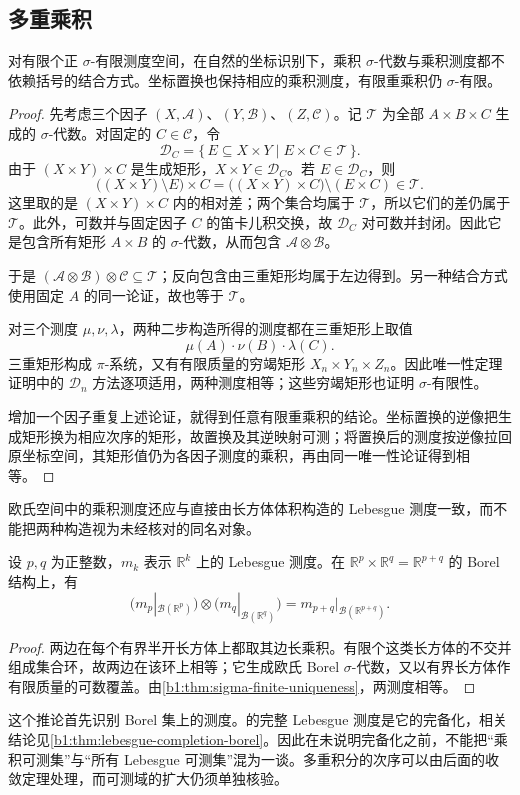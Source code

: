 \subsection{多重乘积}
\label{b1:subsec:070204}

\begin{proposition}\label{b1:prop:finite-product-associativity}
对有限个正 \(\sigma\)-有限测度空间，在自然的坐标识别下，乘积 \(\sigma\)-代数与乘积测度都不依赖括号的结合方式。坐标置换也保持相应的乘积测度，有限重乘积仍 \(\sigma\)-有限。
\end{proposition}
\begin{proof}
先考虑三个因子 \((X,\mathcal A)\)、\((Y,\mathcal B)\)、\((Z,\mathcal C)\)。记 \(\mathcal T\) 为全部 \(A\times B\times C\) 生成的 \(\sigma\)-代数。对固定的 \(C\in\mathcal C\)，令
\[
\mathcal D_C=\{\,E\subseteq X\times Y\mid E\times C\in\mathcal T\,\}.
\]
由于 \((X\times Y)\times C\) 是生成矩形，\(X\times Y\in\mathcal D_C\)。若 \(E\in\mathcal D_C\)，则
\[
\bigl((X\times Y)\setminus E\bigr)\times C
=\bigl((X\times Y)\times C\bigr)\setminus(E\times C)\in\mathcal T.
\]
这里取的是 \((X\times Y)\times C\) 内的相对差；两个集合均属于 \(\mathcal T\)，所以它们的差仍属于 \(\mathcal T\)。此外，可数并与固定因子 \(C\) 的笛卡儿积交换，故 \(\mathcal D_C\) 对可数并封闭。因此它是包含所有矩形 \(A\times B\) 的 \(\sigma\)-代数，从而包含 \(\mathcal A\otimes\mathcal B\)。

于是 \((\mathcal A\otimes\mathcal B)\otimes\mathcal C\subseteq\mathcal T\)；反向包含由三重矩形均属于左边得到。另一种结合方式使用固定 \(A\) 的同一论证，故也等于 \(\mathcal T\)。

对三个测度 \(\mu,\nu,\lambda\)，两种二步构造所得的测度都在三重矩形上取值
\[
\mu(A)\cdot\nu(B)\cdot\lambda(C).
\]
三重矩形构成 \(\pi\)-系统，又有有限质量的穷竭矩形 \(X_n\times Y_n\times Z_n\)。因此唯一性定理证明中的 \(\mathcal D_n\) 方法逐项适用，两种测度相等；这些穷竭矩形也证明 \(\sigma\)-有限性。

增加一个因子重复上述论证，就得到任意有限重乘积的结论。坐标置换的逆像把生成矩形换为相应次序的矩形，故置换及其逆映射可测；将置换后的测度按逆像拉回原坐标空间，其矩形值仍为各因子测度的乘积，再由同一唯一性论证得到相等。
\end{proof}

欧氏空间中的乘积测度还应与直接由长方体体积构造的 Lebesgue 测度一致，而不能把两种构造视为未经核对的同名对象。

\begin{corollary}\label{b1:cor:euclidean-product-measure}
设 \(p,q\) 为正整数，\(m_k\) 表示 \(\mathbb R^k\) 上的 Lebesgue 测度。在 \(\mathbb R^p\times\mathbb R^q=\mathbb R^{p+q}\) 的 Borel 结构上，有
\[
\bigl(m_p|_{\mathcal B(\mathbb R^p)}\bigr)
\otimes\bigl(m_q|_{\mathcal B(\mathbb R^q)}\bigr)
=m_{p+q}|_{\mathcal B(\mathbb R^{p+q})}.
\]
\end{corollary}
\begin{proof}
两边在每个有界半开长方体上都取其边长乘积。有限个这类长方体的不交并组成集合环，故两边在该环上相等；它生成欧氏 Borel \(\sigma\)-代数，又以有界长方体作有限质量的可数覆盖。由\cref{b1:thm:sigma-finite-uniqueness}，两测度相等。
\end{proof}

这个推论首先识别 Borel 集上的测度。的完整 Lebesgue 测度是它的完备化，相关结论见\cref{b1:thm:lebesgue-completion-borel}。因此在未说明完备化之前，不能把“乘积可测集”与“所有 Lebesgue 可测集”混为一谈。多重积分的次序可以由后面的收敛定理处理，而可测域的扩大仍须单独核验。

